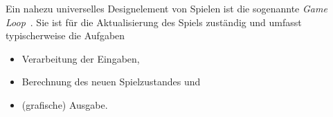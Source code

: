 Ein nahezu universelles Designelement von Spielen ist die sogenannte \emph{Game Loop}~\cite{}. Sie ist für die Aktualisierung des Spiels zuständig und umfasst typischerweise die Aufgaben 
\begin{itemize}
\item Verarbeitung der Eingaben,
\item Berechnung des neuen Spielzustandes und
\item (grafische) Ausgabe.
\end{itemize}
